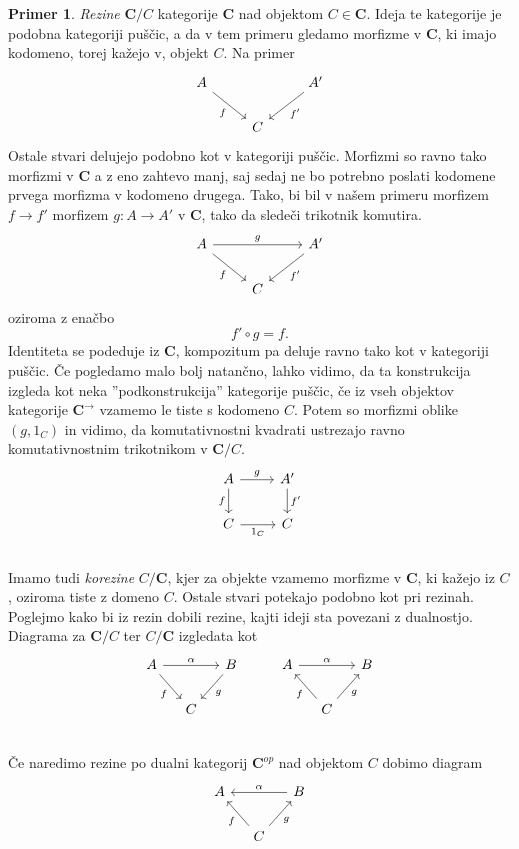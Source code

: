 \documentclass[12pt,a4paper]{book}
\theoremstyle{definition}
\theoremstyle{plain}
\theoremstyle{definition}
\newtheorem{primer}{Primer}[section]
\theoremstyle{remark}
\newcommand{\cat}[1]{\textbf{#1}}
\begin{document}
\begin{primer}
\emph{Rezine} $\cat{C}/C$ kategorije $\cat{C}$ nad objektom $C \in \cat{C}$. Ideja te kategorije je podobna kategoriji puščic, a da v tem primeru gledamo morfizme v $\cat{C}$, ki imajo kodomeno, torej kažejo v, objekt $C$. Na primer
%
\[ \begin{tikzcd}
A \arrow[rd, "f"'] & & \arrow[ld, "f'"] A' \\
& C &
\end{tikzcd} \]
%
Ostale stvari delujejo podobno kot v kategoriji puščic. Morfizmi so ravno tako morfizmi v $\cat{C}$ a z eno zahtevo manj, saj sedaj ne bo potrebno poslati kodomene prvega morfizma v kodomeno drugega. Tako, bi bil v našem primeru morfizem $f \to f'$ morfizem $g : A \to A'$ v $\cat{C}$, tako da sledeči trikotnik komutira.
%
\[ \begin{tikzcd}
A \arrow[rd, "f"'] \ar[rr, "g"] & & \arrow[ld, "f'"] A' \\
& C &
\end{tikzcd} \]
oziroma z enačbo
$$f' \circ g = f.$$
Identiteta se podeduje iz $\cat{C}$, kompozitum pa deluje ravno tako kot v kategoriji puščic. Če pogledamo malo bolj natančno, lahko vidimo, da ta konstrukcija izgleda kot neka ''podkonstrukcija'' kategorije puščic, če iz vseh objektov kategorije $\cat{C}^{\rightarrow}$ vzamemo le tiste s kodomeno $C$. Potem so morfizmi oblike $(g, 1_C)$ in vidimo, da komutativnostni kvadrati ustrezajo ravno komutativnostnim trikotnikom v $\cat{C}/C$.
%
\[ \begin{tikzcd}
A \ar[d, "f"'] \ar[r, "g"] & A' \ar[d, "f'"] \\
C \ar[r, "1_C"'] & C \\
\end{tikzcd} \]
%
Imamo tudi \emph{korezine} $C/\cat{C}$, kjer za objekte vzamemo morfizme v $\cat{C}$, ki kažejo iz $C$, oziroma tiste z domeno $C$. Ostale stvari potekajo podobno kot pri rezinah.
Poglejmo kako bi iz rezin dobili rezine, kajti ideji sta povezani z dualnostjo.
Diagrama za $\cat{C}/C$ ter $C/\cat{C}$ izgledata kot
$$\begin{tikzcd}[column sep=small]
A \ar[dr, "f"'] \ar[rr, "\alpha"] & &  B \ar[dl, "g"] & & A \ar[rr, "\alpha"] && B \\
& C &  & & & C \ar[ul, "f"] \ar[ur, "g"'] & \\
\end{tikzcd}$$
Če naredimo rezine po dualni kategorij $\cat{C}^{op}$ nad objektom $C$ dobimo diagram
$$\begin{tikzcd}[column sep=small]
A && B \ar[ll, "\alpha"'] \\
& C \ar[ul, "f"] \ar[ur, "g"'] &
\end{tikzcd}$$

\end{primer}
\end{document}
